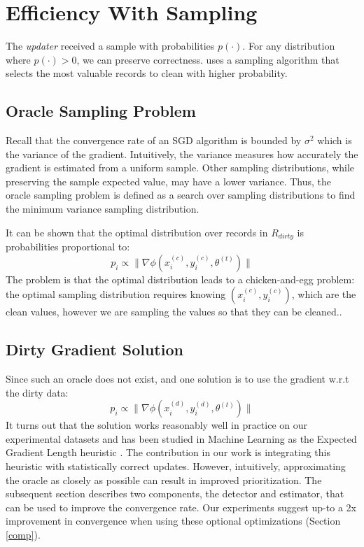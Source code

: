 \section{Efficiency With Sampling}\label{dist-samp}
The \emph{updater} received a sample with probabilities $p(\cdot)$.
For any distribution where  $p(\cdot) > 0$, we can preserve correctness.
\sys uses a sampling algorithm that selects the most valuable records to clean with higher probability. 

\subsection{Oracle Sampling Problem}
Recall that the convergence rate of an SGD algorithm is bounded by $\sigma^2$ which is the variance of the gradient.
Intuitively, the variance measures how accurately the gradient is estimated from a uniform sample.
Other sampling distributions, while preserving the sample expected value, may have a lower variance.
Thus, the oracle sampling problem is defined as a search over sampling distributions to find the minimum variance sampling distribution.

It can be shown that the optimal distribution over records in $R_{dirty}$ is probabilities proportional to:
\[
p_i \propto \|\nabla\phi(x^{(c)}_i,y^{(c)}_i,\theta^{(t)})\|
\]
The problem is that the optimal distribution leads to a chicken-and-egg problem:
the optimal sampling distribution requires knowing $(x^{(c)}_i,y^{(c)}_i)$, which are the clean values, however we are sampling the values so that they can be cleaned..

\subsection{Dirty Gradient Solution}\label{dgsample}
Since such an oracle does not exist, and one solution is to use the gradient w.r.t the dirty data:
\[
p_i \propto \|\nabla\phi(x^{(d)}_i,y^{(d)}_i,\theta^{(t)})\|
\]
It turns out that the solution works reasonably well in practice on our experimental datasets and has been studied in Machine Learning as the Expected Gradient Length heuristic \cite{settles2010active}.
The contribution in our work is integrating this heuristic with statistically correct updates.
However, intuitively, approximating the oracle as closely as possible can result in improved prioritization.
The subsequent section describes two components, the detector and estimator, that can be used to improve the convergence rate.
Our experiments suggest up-to a 2x improvement in convergence when using these optional optimizations (Section \ref{comp}).